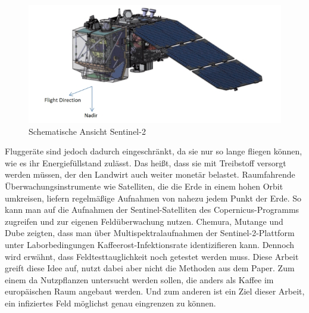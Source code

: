 \\\\
\begin{figure}[ht]
  \centering
  \includegraphics[width=.7\textwidth]{pics/sentinel.jpg}
  \caption{Schematische Ansicht Sentinel-2\cite{ref:sentinel:descr}}
  \label{fig:anthracnose}
\end{figure}
\noindent
Fluggeräte sind jedoch dadurch eingeschränkt, da sie nur so lange fliegen können, wie es ihr Energiefüllstand zulässt. Das heißt, dass sie mit Treibstoff versorgt werden müssen, der den Landwirt auch weiter monetär belastet. Raumfahrende Überwachungsinstrumente wie Satelliten, die die Erde in einem hohen Orbit umkreisen, liefern regelmäßige Aufnahmen von nahezu jedem Punkt der Erde. So kann man auf die Aufnahmen der Sentinel-Satelliten des Copernicus-Programms zugreifen und zur eigenen Feldüberwachung nutzen. Chemura, Mutange und Dube zeigten, dass man über Multispektralaufnahmen der Sentinel-2-Plattform unter Laborbedingungen Kaffeerost-Infektionsrate identizifieren kann.\cite[S. 877]{ref:chemura} Dennoch wird erwähnt, dass Feldtesttauglichkeit noch getestet werden muss.\cite[S. 859]{ref:chemura} Diese Arbeit greift diese Idee auf, nutzt dabei aber nicht die Methoden aus dem Paper. Zum einem da Nutzpflanzen untersucht werden sollen, die anders als Kaffee im europäischen Raum angebaut werden. Und zum anderen ist ein Ziel dieser Arbeit, ein infiziertes Feld möglichst genau eingrenzen zu können. 